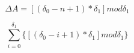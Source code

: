 \begin{equation}\label{first}
\Delta A = [( \delta_{0} - n + 1 ) * \delta_{1}] mod \delta_{1}
\end{equation}

\begin{equation}\label{first}
\sum_{i=0}^{\delta_{1}} \lbrace [( \delta_{0} - i + 1 ) * \delta_{1}] mod \delta_{1} \rbrace
\end{equation}

%
%
%





